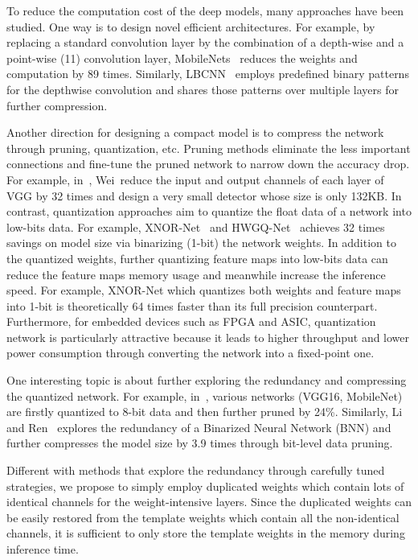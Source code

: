 \documentclass[10pt,twocolumn,letterpaper]{article}
\begin{document}
To reduce the computation cost of the deep models, many  approaches have been studied. One way is to design novel efficient architectures. For example, by replacing a standard convolution layer by the combination of a depth-wise and a point-wise (11) convolution layer, MobileNets~\cite{MobileNetv1} reduces the weights and computation by 89 times. Similarly, LBCNN~\cite{LBCNN} employs predefined binary patterns for the depthwise convolution and shares those patterns over multiple layers for further compression.

Another direction for designing a compact model is to compress the network through pruning, quantization, etc. Pruning methods eliminate the less important connections and fine-tune the pruned network to narrow down the accuracy drop. For example, in~\cite{QunatMimic}, Wei~\etal reduce the input and output channels of each layer of VGG by 32 times and design a  very small detector whose size is only 132KB. In contrast, quantization approaches aim to quantize the float data of a network into low-bits data. For example, XNOR-Net~\cite{XNOR} and HWGQ-Net~\cite{HWGQ} achieves 32 times savings on model size via binarizing (1-bit) the network weights. In addition to the quantized weights,  further quantizing feature maps into low-bits data can reduce the feature maps memory usage and meanwhile increase the inference speed. For example, XNOR-Net which quantizes both weights and feature maps into 1-bit is theoretically 64 times faster than its full precision counterpart. Furthermore, for embedded devices such as FPGA and ASIC, quantization network is particularly attractive because it leads to higher throughput and lower power consumption through converting the network into a fixed-point one.  

One interesting topic is about further exploring the redundancy and  compressing the quantized network. For example, in~\cite{ToCompress}, various networks (VGG16, MobileNet) are firstly quantized to 8-bit data and then further pruned by 24\%. Similarly, Li and Ren~\cite{BNNPrune} explores the redundancy of a Binarized Neural Network (BNN) and further compresses the model size by 3.9 times through bit-level data pruning. 

Different with methods that explore the redundancy through carefully tuned strategies, we propose to simply employ duplicated weights which contain lots of identical channels for the weight-intensive layers. Since the duplicated weights can be easily restored from the template weights which contain all the non-identical channels, it is sufficient to only store the template weights in the memory during inference time.
\end{document}
